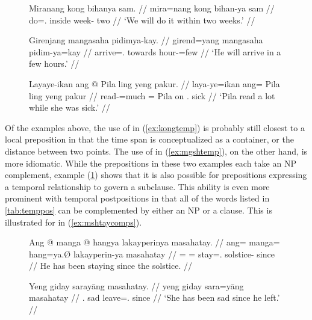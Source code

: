 \begin{figure}[h]
\pex
\a\label{ex:kongtemp}\begingl
	\gla Miranang kong bihanya sam. //
	\glb mira=nang kong bihan-ya sam //
	\glc do=\Fpl{}.\Aarg{} inside week-\Loc{} two //
	\glft `We will do it within two weeks.' //
\endgl

\a\label{ex:mgshtemp}\begingl
	\gla Girenjang mangasaha pidimya-kay. //
	\glb girend=yang mangasaha pidim-ya=kay //
	\glc arrive=\TsgM{}.\Aarg{} towards hour-\Loc{}=few //
	\glft `He will arrive in a few hours.' //
\endgl

\a\label{ex:lingtemp}\begingl
	\gla Layaye-ikan ang @ Pila ling yeng pakur. //
	\glb laya-ye=ikan ang= Pila ling yeng pakur //
	\glc read-\TsgF{}=much \Aarg{}= Pila on \TsgF{}.\Aarg{} sick //
	\glft `Pila read a lot while she was sick.' //
\endgl
\xe
\end{figure}

Of the examples above, the use of  in (\ref{ex:kongtemp}) is
probably still closest to a local preposition in that the time span is
conceptualized as a container, or the distance between two points. The use of
 in (\ref{ex:mgshtemp}), on the other hand, is more
idiomatic. While the prepositions in these two examples each take an NP
complement, example (\ref{ex:lingtemp}) shows that it is also possible for
prepositions expressing a temporal relationship to govern a subclause. This
ability is even more prominent with temporal postpositions in that all of the
words listed in \autoref{tab:temppos} can be complemented by either an NP or a
clause. This is illustrated for  in
(\ref{ex:mshtaycomps}).

\begin{figure}[h]
\pex\label{ex:mshtaycomps}
\a\label{ex:mshtaynp}\begingl
	\gla Ang @ manga @ hangya lakayperinya masahatay. //
	\glb ang= manga= hang=ya.Ø lakayperin-ya masahatay //
	\glc \AgtT{}= \Prog{}= stay=\TsgM{}.\Top{} solstice-\Loc{} since //
	\glft He has been staying since the solstice. //
\endgl

\a\label{ex:mshtays}\begingl
	\gla Yeng giday sarayāng masahatay. //
	\glb yeng giday sara=yāng masahatay //
	\glc \TsgF{}.\Aarg{} sad leave=\TsgM{}.\Aarg{} since //
	\glft `She has been sad since he left.' //
\endgl
\xe
\end{figure}


